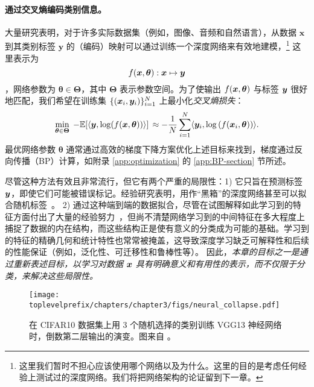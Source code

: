 \documentclass[../../book-main_zh.tex]{subfiles}
\begin{document}
\paragraph{通过交叉熵编码类别信息。}  大量研究表明，对于许多实际数据集（例如，图像、音频和自然语言），从数据 $\bm{x}$ 到其类别标签 $\bm{y}$ 的（编码）映射可以通过训练一个深度网络来有效地建模，\footnote{这里我们暂时不担心应该使用哪个网络以及为什么。这里的目的是考虑任何经验上测试过的深度网络。我们将把网络架构的论证留到下一章。} 这里表示为 $$f(\bm{x}, \bm \theta):\bm{x} \mapsto \bm{y}$$，网络参数为 $\bm \theta \in \bm \Theta$，其中 $\bm \Theta$ 表示参数空间。为了使输出 $f(\bm{x}, \bm \theta)$ 与标签 $\bm{y}$ 很好地匹配，我们希望在训练集 $\{(\bm{x}_i, \bm{y}_i)\}_{i=1}^N$ 上最小化{\em 交叉熵损失}：
\begin{equation}
   \min_{\bm \theta \in \bm \Theta} \; - \mathbb{E}[\langle \bm{y}, \log(f(\bm{x}, \bm \theta)) \rangle] \, \approx - \frac{1}{N}\sum_{i=1}^N \langle \bm{y}_i, \log\left(f(\bm{x}_i, \bm \theta)\right) \rangle.
   \label{chap4-eqn:cross-entropy}
\end{equation}
最优网络参数 $\bm \theta $ 通常通过高效的梯度下降方案优化上述目标来找到，梯度通过反向传播（BP）计算，如附录 \ref{app:optimization} 的 \ref{app:BP-section} 节所述。

尽管这种方法有效且非常流行，但它有两个严重的局限性：1) 它只旨在预测标签 $\bm{y}$，即使它们可能被错误标记。经验研究表明，用作“黑箱”的深度网络甚至可以拟合随机标签~\cite{zhang2017understanding}。
2) 通过这种端到端的数据拟合，尽管在试图解释如此学习到的特征方面付出了大量的经验努力~\cite{Zeiler-ECCV2014}，但尚不清楚网络学习到的中间特征在多大程度上捕捉了数据的内在结构，而这些结构正是使有意义的分类成为可能的基础。学习到的特征的精确几何和统计特性也常常被掩盖，这导致深度学习缺乏可解释性和后续的性能保证（例如，泛化性、可迁移性和鲁棒性等）。
因此，{\em 本章的目标之一是通过重新表述目标，以学习对数据 $\bm{x}$ 具有明确意义和有用性的表示，而不仅限于分类，来解决这些局限性。}

\begin{figure}
	\centering
	\texttt{[image: \\toplevelprefix/chapters/chapter3/figs/neural\_collapse.pdf]}
	\caption{在 CIFAR10 数据集上用 3 个随机选择的类别训练 VGG13 神经网络时，倒数第二层输出的演变。图来自 \cite{papyan2020prevalence}。}
	\label{chap4-fig:neural-collapse}
\end{figure}
\end{document}
